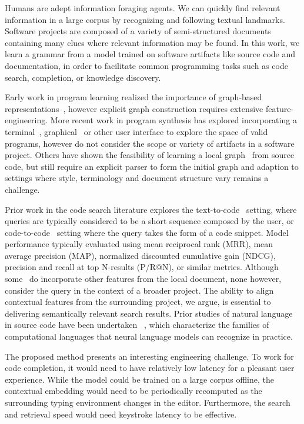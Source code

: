 \documentclass[10pt]{article}
\begin{document}
Humans are adept information foraging agents. We can quickly find relevant information in a large corpus by recognizing and following textual landmarks. Software projects are composed of a variety of semi-structured documents containing many clues where relevant information may be found. In this work, we learn a grammar from a model trained on software artifacts like source code and documentation, in order to facilitate common programming tasks such as code search, completion, or knowledge discovery.

Early work in program learning realized the importance of graph-based representations~\cite{allamanis2017learning}, however explicit graph construction requires extensive feature-engineering. More recent work in program synthesis has explored incorporating a terminal~\cite{ellis2019write}, graphical~\cite{walke2020learning} or other user interface to explore the space of valid programs, however do not consider the scope or variety of artifacts in a software project. Others have shown the feasibility of learning a local graph~\cite{johnson2020learning} from source code, but still require an explicit parser to form the initial graph and adaption to settings where style, terminology and document structure vary remains a challenge.

Prior work in the code search literature explores the text-to-code~\cite{husain2019codesearchnet} setting, where queries are typically considered to be a short sequence composed by the user, or code-to-code~\cite{kim2018facoy} setting where the query takes the form of a code snippet. Model performance typically evaluated using mean reciprocal rank (MRR), mean average precision (MAP), normalized discounted cumulative gain (NDCG), precision and recall at top N-results (P/R@N), or similar metrics. Although some~\cite{asyrofi2020ausearch} do incorporate other features from the local document, none however, consider the query in the context of a broader project. The ability to align contextual features from the surrounding project, we argue, is essential to delivering semantically relevant search results. Prior studies of natural language in source code have been undertaken ~\cite{weiss2018practical, chirkova2020empirical, chen2021evaluating}, which characterize the families of computational languages that neural language models can recognize in practice.

The proposed method presents an interesting engineering challenge. To work for code completion, it would need to have relatively low latency for a pleasant user experience. While the model could be trained on a large corpus offline, the contextual embedding would need to be periodically recomputed as the surrounding typing environment changes in the editor. Furthermore, the search and retrieval speed would need keystroke latency to be effective.
\end{document}
